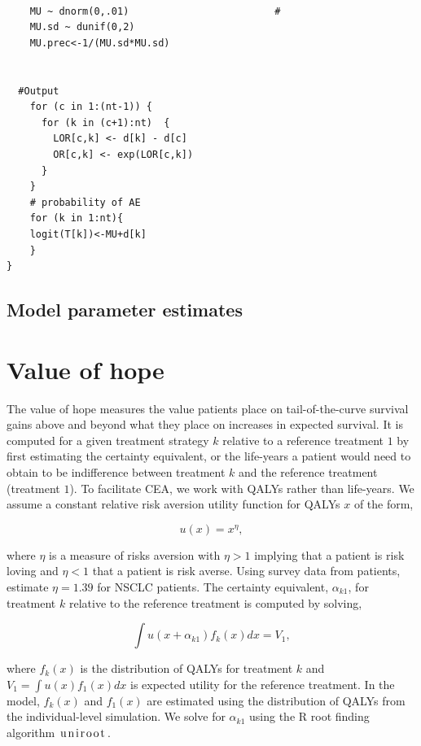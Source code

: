 \documentclass[11pt,final,fleqn]{article}\usepackage[]{graphicx}\usepackage[]{color}
\theoremstyle{plain}
\newcommand\R{{\textsf{R}}}
\begin{document}
\begin{appendices}
\begin{verbatim}
      
    MU ~ dnorm(0,.01)                         #
    MU.sd ~ dunif(0,2) 
    MU.prec<-1/(MU.sd*MU.sd)
    
      
  #Output                                       
    for (c in 1:(nt-1)) {                        
      for (k in (c+1):nt)  { 
        LOR[c,k] <- d[k] - d[c]
        OR[c,k] <- exp(LOR[c,k])
      }  
    }
    # probability of AE
    for (k in 1:nt){ 
    logit(T[k])<-MU+d[k]
    }
}

\end{verbatim}


\subsection{Model parameter estimates}



\section{Value of hope} \label{app:value-of-hope}
The value of hope measures the value patients place on tail-of-the-curve survival gains above and beyond what they place on increases in expected survival. It is computed for a given treatment strategy $k$ relative to a reference treatment $1$ by first estimating the certainty equivalent, or the life-years a patient would need to obtain to be indifference between treatment $k$ and the reference treatment (treatment $1$). To facilitate CEA, we work with QALYs rather than life-years. We assume a constant relative risk aversion utility function for QALYs $x$ of the form,

\begin{equation}\label{eqn:value-of-hope}
u(x) = x^\eta,
\end{equation}

where $\eta$ is a measure of risks aversion with $\eta > 1$ implying that a patient is risk loving and $\eta < 1$ that a patient is risk averse. Using survey data from patients, \citet{shafrin2017patient} estimate $\eta = 1.39$ for NSCLC patients. The certainty equivalent, $\alpha_{k1}$, for treatment $k$ relative to the reference treatment is computed by solving,

\begin{equation}
\int u(x + \alpha_{k1}) f_k(x) dx = V_1,
\end{equation}    

where $f_k(x)$ is the distribution of QALYs for treatment $k$ and $V_1 = \int u(x)f_1(x) dx$ is expected utility for the reference treatment. In the model, $f_k(x)$ and $f_1(x)$ are estimated using the distribution of QALYs from the individual-level simulation. We solve for $\alpha_{k1}$ using the \R{} root finding algorithm $\lstinline[columns=fixed]{uniroot}$. 


\end{appendices}
\end{document}

